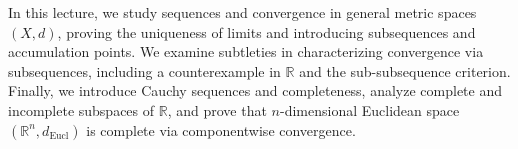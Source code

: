 


\begin{overview}
In this lecture, we study sequences and convergence in general metric spaces $(X, d)$, proving the uniqueness of limits and introducing subsequences and accumulation points. We examine subtleties in characterizing convergence via subsequences, including a counterexample in $\mathbb{R}$ and the sub-subsequence criterion. Finally, we introduce Cauchy sequences and completeness, analyze complete and incomplete subspaces of $\mathbb{R}$, and prove that $n$-dimensional Euclidean space $(\mathbb{R}^n, d_{\text{Eucl}})$ is complete via componentwise convergence.
\end{overview}


